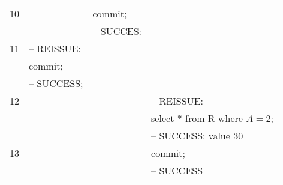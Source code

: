 \documentclass[addpoints,answers,12pt]{exam}
\begin{document}
\begin{questions}
\begin{parts}
\begin{subparts}
\begin{solution}
{\begin{tabular}{|c|l|l|l|}
10 &                                & commit;            & \\
  &                                 & -- SUCCES:            & \\ \hline
11 & -- REISSUE:                    &                     & \\
   & commit;                        &                     & \\
   & -- SUCCESS;                    &                    & \\ \hline
12 &                                &                    & -- REISSUE: \\
   &                                &                    & select * from R where $A=2$; \\
   &                                &                    & -- SUCCESS: value 30 \\ \hline
13 &                                &                     & commit; \\
   &                                &                     & -- SUCCESS \\ \hline
\end{tabular}
}

  \end{solution}

\newpage


\end{subparts}
\end{parts}
\end{questions}
\end{document}
